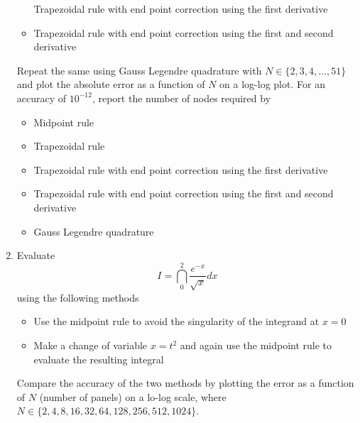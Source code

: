 \documentclass{article}
\begin{document}
\begin{enumerate}
\begin{itemize}
			Trapezoidal rule with end point correction using the first derivative
			\item
			Trapezoidal rule with end point correction using the first and second derivative
		\end{itemize}
		Repeat the same using Gauss Legendre quadrature with $N \in \{2,3,4,\ldots,51\}$ and plot the absolute error as a function of $N$ on a log-log plot. For an accuracy of $10^{-12}$, report the number of nodes required by
		\begin{itemize}
			\item
			Midpoint rule
			\item
			Trapezoidal rule
			\item
			Trapezoidal rule with end point correction using the first derivative
			\item
			Trapezoidal rule with end point correction using the first and second derivative
			\item
			Gauss Legendre quadrature
		\end{itemize}
		\item
		Evaluate
		$$I = \dint_0^2 \dfrac{e^{-x}}{\sqrt{x}}dx$$
		using the following methods
		\begin{itemize}
			\item
			Use the midpoint rule to avoid the singularity of the integrand at $x=0$
			\item
			Make a change of variable $x=t^2$ and again use the midpoint rule to evaluate the resulting integral
		\end{itemize}
		Compare the accuracy of the two methods by plotting the error as a function of $N$ (number of panels) on a lo-log scale, where $N \in \{2,4,8,16,32,64,128,256,512,1024\}$.
	\end{enumerate}
\end{document}
